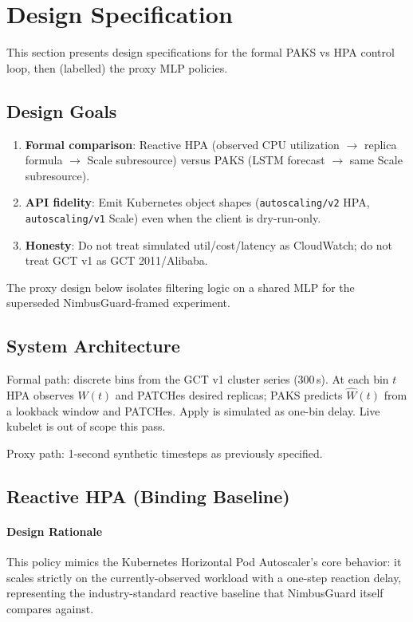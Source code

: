 
\section{Design Specification}
\label{sec:Design}

This section presents design specifications for the formal PAKS vs HPA control loop, then (labelled) the proxy MLP policies.

\subsection{Design Goals}

\begin{enumerate}
  \item \textbf{Formal comparison}: Reactive HPA (observed CPU utilization $\rightarrow$ replica formula $\rightarrow$ Scale subresource) versus PAKS (LSTM forecast $\rightarrow$ same Scale subresource).
  \item \textbf{API fidelity}: Emit Kubernetes object shapes (\texttt{autoscaling/v2} HPA, \texttt{autoscaling/v1} Scale) even when the client is dry-run-only.
  \item \textbf{Honesty}: Do not treat simulated util/cost/latency as CloudWatch; do not treat GCT v1 as GCT 2011/Alibaba.
\end{enumerate}

The proxy design below isolates filtering logic on a shared MLP for the superseded NimbusGuard-framed experiment.

\subsection{System Architecture}

Formal path: discrete bins from the GCT v1 cluster series (300\,s). At each bin $t$ HPA observes $W(t)$ and PATCHes desired replicas; PAKS predicts $\hat W(t)$ from a lookback window and PATCHes. Apply is simulated as one-bin delay. Live kubelet is out of scope this pass.

Proxy path: 1-second synthetic timesteps as previously specified.

\subsection{Reactive HPA (Binding Baseline)}

\paragraph{Design Rationale} This policy mimics the Kubernetes Horizontal Pod Autoscaler's core behavior: it scales strictly on the currently-observed workload with a one-step reaction delay, representing the industry-standard reactive baseline that NimbusGuard itself compares against.


